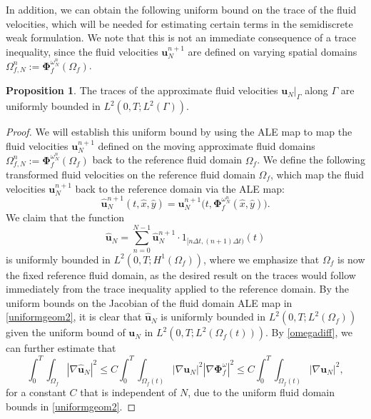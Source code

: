 \documentclass[11pt]{article}
\newcommand{\bd}{\boldsymbol}
\theoremstyle{definition}
\newtheorem{proposition}{Proposition}[section]
\begin{document}
In addition, we can obtain the following uniform bound on the trace of the fluid velocities, which will be needed for estimating certain terms in the semidiscrete weak formulation. We note that this is not an immediate consequence of a trace inequality, since the fluid velocities $\bd{u}^{n + 1}_{N}$ are defined on varying spatial domains $\Omega^{n}_{f, N} := \bd{\Phi}^{\omega^{n}_{N}}_{f}(\Omega_{f})$. 

\begin{proposition}\label{traceuniform}
The traces of the approximate fluid velocities $\bd{u}_{N}|_{\Gamma}$ along $\Gamma$ are uniformly bounded in $L^{2}(0, T; L^{2}(\Gamma))$. 
\end{proposition}

\begin{proof}
We will establish this uniform bound by using the ALE map to map the fluid velocities $\bd{u}^{n + 1}_{N}$ defined on the moving approximate fluid domains $\Omega^{n}_{f, N} := \bd{\Phi}^{\omega^{n}_{N}}_{f}(\Omega_{f})$ back to the reference fluid domain $\Omega_{f}$. We define the following transformed fluid velocities on the reference fluid domain $\Omega_{f}$, which map the fluid velocities $\bd{u}^{n + 1}_{N}$ back to the reference domain via the ALE map:
\begin{equation*}
\hat{\bd{u}}^{n + 1}_{N}(t, \hat{x}, \hat{y}) = \bd{u}^{n + 1}_{N}\Big(t, \bd{\Phi}^{\omega^{n}_{N}}_{f}(\hat{x}, \hat{y})\Big).
\end{equation*}
We claim that the function 
\begin{equation}\label{hatu}
\hat{\bd{u}}_{N} = \sum_{n = 0}^{N - 1} \hat{\bd{u}}^{n + 1}_{N} \cdot 1_{[n\Delta t, (n + 1)\Delta t)}(t)
\end{equation}
is uniformly bounded in $L^{2}(0, T; H^{1}(\Omega_{f}))$, where we emphasize that $\Omega_{f}$ is now the fixed reference fluid domain, as the desired result on the traces would follow immediately from the trace inequality applied to the reference domain. By the uniform bounds on the Jacobian of the fluid domain ALE map in \eqref{uniformgeom2}, it is clear that $\hat{\bd{u}}_{N}$ is uniformly bounded in $L^{2}(0, T; L^{2}(\Omega_{f}))$ given the uniform bound of $\bd{u}_{N}$ in $L^{2}(0, T; L^{2}(\Omega_{f}(t)))$. By \eqref{omegadiff}, we can further estimate that
\begin{equation*}
\int_{0}^{T} \int_{\Omega_{f}} |\nabla \hat{\bd{u}}_{N}|^{2} \le C \int_{0}^{T} \int_{\Omega_{f}(t)} |\nabla \bd{u}_{N}|^{2} |\nabla \bd{\Phi}^{\omega}_{f}|^{2} \le C \int_{0}^{T} \int_{\Omega_{f}(t)} |\nabla \bd{u}_{N}|^{2},
\end{equation*}
for a constant $C$ that is independent of $N$, due to the uniform fluid domain bounds in \eqref{uniformgeom2}.
\end{proof}
\end{document}
